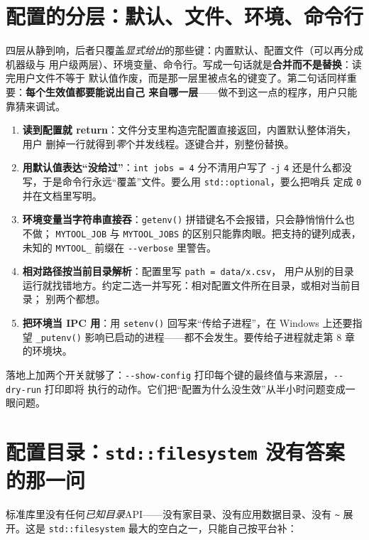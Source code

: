 \documentclass[12pt,a4paper,fontset=fandol]{ctexbook}
\newcommand{\Fn}[1]{\texttt{#1()}}
\newcommand{\Tp}[1]{\texttt{#1}}
\newcommand{\Opt}[1]{\texttt{-\/-#1}}
\newcommand{\Short}[1]{\texttt{-#1}}
\begin{document}
\section{配置的分层：默认、文件、环境、命令行}

四层从静到响，后者只覆盖\emph{显式给出}的那些键：内置默认、配置文件（可以再分成机器级与
用户级两层）、环境变量、命令行。写成一句话就是\textbf{合并而不是替换}：读完用户文件不等于
默认值作废，而是那一层里被点名的键变了。第二句话同样重要：\textbf{每个生效值都要能说出自己
来自哪一层}——做不到这一点的程序，用户只能靠猜来调试。

\begin{warning}[title={优先级上最常犯的五个错}]
\begin{enumerate}[label=\arabic*.,leftmargin=2.2em]
\item \textbf{读到配置就 return}：文件分支里构造完配置直接返回，内置默认整体消失，用户
      删掉一行就得到\emph{零}个并发线程。逐键合并，别整份替换。
\item \textbf{用默认值表达``没给过''}：\Tp{int jobs = 4} 分不清用户写了 \Short{j} \Tp{4}
      还是什么都没写，于是命令行永远``覆盖''文件。要么用 \Tp{std::optional}，要么把哨兵
      定成 \Tp{0} 并在文档里写明。
\item \textbf{环境变量当字符串直接吞}：\Fn{getenv} 拼错键名不会报错，只会静悄悄什么也不做；
      \Tp{MYTOOL\_JOB} 与 \Tp{MYTOOL\_JOBS} 的区别只能靠肉眼。把支持的键列成表，未知的
      \Tp{MYTOOL\_} 前缀在 \Opt{verbose} 里警告。
\item \textbf{相对路径按当前目录解析}：配置里写 \Tp{path = \textquotedbl data/x.csv\textquotedbl}，
      用户从别的目录运行就找错地方。约定二选一并写死：相对配置文件所在目录，或相对当前目录；
      别两个都想。
\item \textbf{把环境当 IPC 用}：用 \Fn{setenv} 回写来``传给子进程''，在 Windows 上还要指望
      \Fn{\_putenv} 影响已启动的进程——都不会发生。要传给子进程就走第 8 章的环境块。
\end{enumerate}
\end{warning}

落地上加两个开关就够了：\Opt{show-config} 打印每个键的最终值与来源层，\Opt{dry-run} 打印即将
执行的动作。它们把``配置为什么没生效''从半小时问题变成一眼问题。

\section{配置目录：\Tp{std::filesystem} 没有答案的那一问}

标准库里没有任何\emph{已知目录}API——没有家目录、没有应用数据目录、没有 \Tp{\textasciitilde}
展开。这是 \Tp{std::filesystem} 最大的空白之一，只能自己按平台补：
\end{document}
